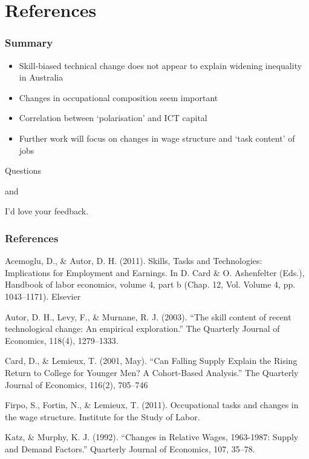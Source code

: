\documentclass[red]{beamer}
\newcommand{\vitem}{\vfill\item}
\begin{document}
\section*{References}

\begin{frame}
  \frametitle{Summary}
  \begin{itemize}
  \vitem Skill-biased technical change does not appear to explain widening inequality in Australia
  \vitem Changes in occupational composition seem important
  \vitem Correlation between `polarisation' and ICT capital
  \vitem Further work will focus on changes in wage structure and `task content' of jobs
  \end{itemize}
\end{frame}

\begin{frame}
  \begin{center}
    Questions
    \vspace{1cm}

    and
    \vspace{1cm}

    I'd love your feedback.
  \end{center}
\end{frame}

\begin{frame}
\frametitle{References}
{ \scriptsize
Acemoglu, D., \& Autor, D. H. (2011). Skills, Tasks and Technologies: Implications for Employment and Earnings. In D. Card \& O. Ashenfelter (Eds.), Handbook of labor economics, volume 4, part b (Chap. 12, Vol. Volume 4, pp. 1043–1171). Elsevier
\vfill

Autor, D. H., Levy, F., \& Murnane, R. J. (2003). “The skill content of recent technological change: An empirical exploration.” The Quarterly Journal of Economics, 118(4), 1279–1333.
\vfill

Card, D., \& Lemieux, T. (2001, May). “Can Falling Supply Explain the Rising Return to College for Younger Men? A Cohort-Based Analysis.” The Quarterly Journal of Economics, 116(2), 705–746
\vfill

Firpo, S., Fortin, N., \& Lemieux, T. (2011). Occupational tasks and changes in the wage structure. Institute for the Study of Labor.
\vfill

Katz, \& Murphy, K. J. (1992). “Changes in Relative Wages, 1963-1987: Supply and Demand Factors.” Quarterly Journal of Economics, 107, 35–78.
}
\end{frame}
\end{document}
